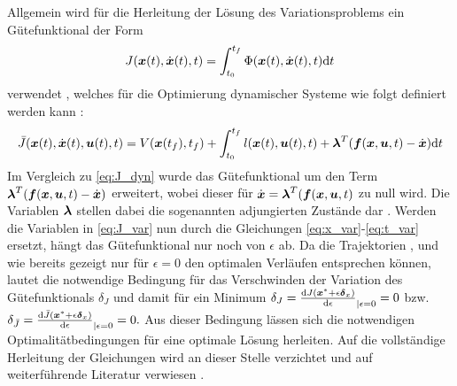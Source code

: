 Allgemein wird für die Herleitung der Lösung des Variationsproblems ein Gütefunktional der Form
\begin{equation}
	J(\boldsymbol{x}(t),\dot{\boldsymbol{x}}(t),t) = \int_{t_0}^{t_f}\Phi(\boldsymbol{x}(t),\dot{\boldsymbol{x}}(t),t)\textrm{d}{t} \label{eq:J_var}
\end{equation}
verwendet \cite{KnutGraichen.2012}, welches für die Optimierung dynamischer Systeme wie folgt definiert werden kann \cite{KnutGraichen.2012}:
\begin{equation}
\bar{J}(\boldsymbol{x}(t),\dot{\boldsymbol{x}}(t),\boldsymbol{u}(t),t) = V(\boldsymbol{x}(t_f),t_f) + \int_{t_0}^{t_f}l(\boldsymbol{x}(t),\boldsymbol{u}(t),t) + \boldsymbol{\lambda}^T(\boldsymbol{f}(\boldsymbol{x},\boldsymbol{u},t) - \dot{\boldsymbol{x}})\textrm{d}{t} \label{eq:J_var_sys}
\end{equation}
Im Vergleich zu \ref{eq:J_dyn} wurde das Gütefunktional um den Term $\boldsymbol{\lambda}^T(\boldsymbol{f}(\boldsymbol{x},\boldsymbol{u},t) - \dot{\boldsymbol{x}})$ erweitert, wobei dieser für $\dot{\boldsymbol{x}} = \boldsymbol{\lambda}^T(\boldsymbol{f}(\boldsymbol{x},\boldsymbol{u},t)$ zu null wird. Die Variablen $\boldsymbol{\lambda}$ stellen dabei die sogenannten adjungierten Zustände dar \cite{KnutGraichen.2012}. Werden die Variablen in \ref{eq:J_var} nun durch die Gleichungen \ref{eq:x_var}-\ref{eq:t_var} ersetzt, hängt das Gütefunktional nur noch von $\epsilon$ ab. Da die Trajektorien \xoft, \dxoft und \uoft wie bereits gezeigt nur für $\epsilon=0$ den optimalen Verläufen entsprechen können, lautet die notwendige Bedingung für das Verschwinden der Variation des Gütefunktionals $\delta_J$ und damit für ein Minimum $\delta_J = \frac{\textrm{d}J({\boldsymbol{x}}^*+\epsilon\boldsymbol{\delta}_{x})}{\textrm{d}{\epsilon}}_{|\epsilon=0}=0$ bzw. $\delta_{\bar{J}} = \frac{\textrm{d}\bar{J}({\boldsymbol{x}}^*+\epsilon\boldsymbol{\delta}_{x})}{\textrm{d}{\epsilon}}_{|\epsilon=0}=0.$
Aus dieser Bedingung lässen sich die notwendigen Optimalitätbedingungen für eine optimale Lösung herleiten. Auf die vollständige Herleitung der Gleichungen wird an dieser Stelle verzichtet und auf weiterführende Literatur verwiesen \cite{KnutGraichen.2012,Papageorgiou.2012,Gerdts.2010}.
